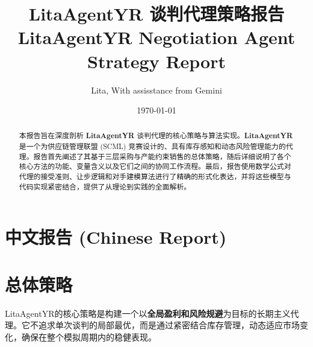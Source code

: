 \documentclass[12pt, a4paper]{article}
\title{LitaAgentYR 谈判代理策略报告 \\ \large LitaAgentYR Negotiation Agent Strategy Report}
\author{Lita, With assisstance from Gemini}
\date{\today}
\begin{document}
\maketitle
\thispagestyle{empty}
\newpage
\tableofcontents
\newpage

\section*{中文报告 (Chinese Report)}

\begin{abstract}
本报告旨在深度剖析 \textbf{LitaAgentYR} 谈判代理的核心策略与算法实现。\textbf{LitaAgentYR} 是一个为供应链管理联盟 (SCML) 竞赛设计的、具有库存感知和动态风险管理能力的代理。报告首先阐述了其基于三层采购与产能约束销售的总体策略，随后详细说明了各个核心方法的功能、变量含义以及它们之间的协同工作流程。最后，报告使用数学公式对代理的接受准则、让步逻辑和对手建模算法进行了精确的形式化表达，并将这些模型与代码实现紧密结合，提供了从理论到实践的全面解析。
\end{abstract}

\section{总体策略}
LitaAgentYR的核心策略是构建一个以\textbf{全局盈利和风险规避}为目标的长期主义代理。它不追求单次谈判的局部最优，而是通过紧密结合库存管理，动态适应市场变化，确保在整个模拟周期内的稳健表现。
\end{document}
